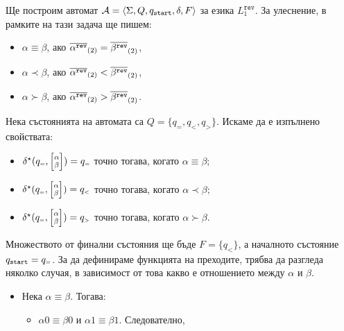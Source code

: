 \begin{hint}
  Ще построим автомат $\mathcal{A} = \langle{\Sigma,Q,q_{\texttt{start}},\delta,F}\rangle$ за езика $L^{\texttt{rev}}_1$.
  За улеснение, в рамките на тази задача ще пишем:
  \begin{itemize}
  \item 
    $\alpha \equiv \beta$, ако $\overline{\alpha^{\texttt{rev}}}_{(2)} = \overline{\beta^{\texttt{rev}}}_{(2)}$,
  \item
    $\alpha \prec \beta$, ако $\overline{\alpha^{\texttt{rev}}}_{(2)} < \overline{\beta^{\texttt{rev}}}_{(2)}$,
  \item
    $\alpha \succ \beta$, ако $\overline{\alpha^{\texttt{rev}}}_{(2)} > \overline{\beta^{\texttt{rev}}}_{(2)}$.
  \end{itemize}
  Нека състоянията на автомата са $Q = \{q_{\scriptscriptstyle{=}},q_{\scriptscriptstyle{<}},q_{\scriptscriptstyle{>}}\}$.
  Искаме да е изпълнено свойствата:
  \begin{itemize}
  \item 
    $\delta^\star(q_{\scriptscriptstyle{=}}, \scriptsize{\begin{bmatrix} \alpha\\ \beta\end{bmatrix}}) = q_{\scriptscriptstyle{=}}$ точно тогава, когато $\alpha \equiv \beta$;
  \item 
    $\delta^\star(q_{\scriptscriptstyle{=}}, \scriptsize{\begin{bmatrix} \alpha\\ \beta\end{bmatrix}}) = q_{\scriptscriptstyle{<}}$ точно тогава, когато $\alpha \prec \beta$;
  \item 
    $\delta^\star(q_{\scriptscriptstyle{=}}, \scriptsize{\begin{bmatrix} \alpha\\ \beta\end{bmatrix}}) = q_{\scriptscriptstyle{>}}$ точно тогава, когато $\alpha \succ \beta$.
  \end{itemize}
  Множеството от финални състояния ще бъде $F = \{q_{\scriptscriptstyle{<}}\}$, а началното състояние $q_{\texttt{start}} = q_{\scriptscriptstyle{=}}$.
  За да дефинираме функцията на преходите, трябва да разгледа няколко случая, в зависимост от това какво е отношението между $\alpha$ и $\beta$.
  \begin{itemize}
  \item
    Нека $\alpha \equiv \beta$. Тогава:  
    \begin{itemize}
    \item 
      $\alpha 0 \equiv \beta 0$ и $\alpha 1 \equiv \beta 1$. Следователно,

\end{itemize}
\end{itemize}
\end{hint}
